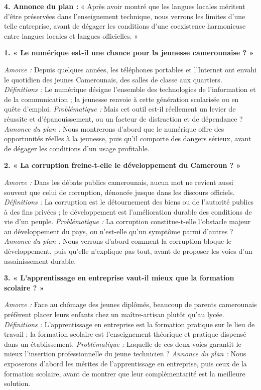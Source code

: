 \documentclass[11pt]{article}
\newcounter{popsec}
\newcounter{popsub}
\newcommand{\courssub}[1]{%
  \stepcounter{popsub}%
  \par\vspace{9pt}\noindent{\popxbold\fontsize{11.5}{13}\selectfont\color{popink}{\color{poporange}\thepopsec.\thepopsub}\hspace{6pt}#1}\par\nopagebreak\vspace{4pt}
}
\begin{document}
\begin{corrige}
\textbf{4. Annonce du plan :} « Après avoir montré que les langues locales méritent d'être préservées dans l'enseignement technique, nous verrons les limites d'une telle entreprise, avant de dégager les conditions d'une coexistence harmonieuse entre langues locales et langues officielles. »
\end{corrige}

\courssub{Rédiger l'introduction}

\begin{corrige}
\textbf{1. « Le numérique est-il une chance pour la jeunesse camerounaise ? »}

\emph{Amorce :} Depuis quelques années, les téléphones portables et l'Internet ont envahi le quotidien des jeunes Camerounais, des salles de classe aux quartiers. \emph{Définitions :} Le numérique désigne l'ensemble des technologies de l'information et de la communication ; la jeunesse renvoie à cette génération scolarisée ou en quête d'emploi. \emph{Problématique :} Mais cet outil est-il réellement un levier de réussite et d'épanouissement, ou un facteur de distraction et de dépendance ? \emph{Annonce du plan :} Nous montrerons d'abord que le numérique offre des opportunités réelles à la jeunesse, puis qu'il comporte des dangers sérieux, avant de dégager les conditions d'un usage profitable.

\textbf{2. « La corruption freine-t-elle le développement du Cameroun ? »}

\emph{Amorce :} Dans les débats publics camerounais, aucun mot ne revient aussi souvent que celui de corruption, dénoncée jusque dans les discours officiels. \emph{Définitions :} La corruption est le détournement des biens ou de l'autorité publics à des fins privées ; le développement est l'amélioration durable des conditions de vie d'un peuple. \emph{Problématique :} La corruption constitue-t-elle l'obstacle majeur au développement du pays, ou n'est-elle qu'un symptôme parmi d'autres ? \emph{Annonce du plan :} Nous verrons d'abord comment la corruption bloque le développement, puis qu'elle n'explique pas tout, avant de proposer les voies d'un assainissement durable.

\textbf{3. « L'apprentissage en entreprise vaut-il mieux que la formation scolaire ? »}

\emph{Amorce :} Face au chômage des jeunes diplômés, beaucoup de parents camerounais préfèrent placer leurs enfants chez un maître-artisan plutôt qu'au lycée. \emph{Définitions :} L'apprentissage en entreprise est la formation pratique sur le lieu de travail ; la formation scolaire est l'enseignement théorique et pratique dispensé dans un établissement. \emph{Problématique :} Laquelle de ces deux voies garantit le mieux l'insertion professionnelle du jeune technicien ? \emph{Annonce du plan :} Nous exposerons d'abord les mérites de l'apprentissage en entreprise, puis ceux de la formation scolaire, avant de montrer que leur complémentarité est la meilleure solution.


\end{corrige}
\end{document}
